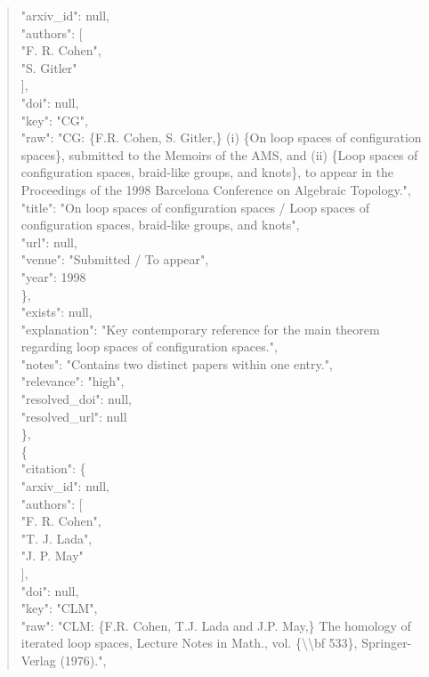 \documentclass[11pt]{article}
\begin{document}
\begin{quote}
        "arxiv\_id": null,\\
        "authors": [\\
          "F. R. Cohen",\\
          "S. Gitler"\\
        ],\\
        "doi": null,\\
        "key": "CG",\\
        "raw": "CG: \{F.R. Cohen, S. Gitler,\} (i) \{On loop spaces of configuration spaces\}, submitted to the Memoirs of the AMS, and (ii) \{Loop spaces of configuration spaces, braid-like groups, and knots\}, to appear in the Proceedings of the 1998 Barcelona Conference on Algebraic Topology.",\\
        "title": "On loop spaces of configuration spaces / Loop spaces of configuration spaces, braid-like groups, and knots",\\
        "url": null,\\
        "venue": "Submitted / To appear",\\
        "year": 1998\\
      \},\\
      "exists": null,\\
      "explanation": "Key contemporary reference for the main theorem regarding loop spaces of configuration spaces.",\\
      "notes": "Contains two distinct papers within one entry.",\\
      "relevance": "high",\\
      "resolved\_doi": null,\\
      "resolved\_url": null\\
    \},\\
    \{\\
      "citation": \{\\
        "arxiv\_id": null,\\
        "authors": [\\
          "F. R. Cohen",\\
          "T. J. Lada",\\
          "J. P. May"\\
        ],\\
        "doi": null,\\
        "key": "CLM",\\
        "raw": "CLM: \{F.R. Cohen, T.J. Lada and J.P. May,\} The homology of iterated loop spaces, Lecture Notes in Math., vol. \{\textbackslash{}\textbackslash{}bf 533\}, Springer-Verlag (1976).",\\

\end{quote}
\end{document}
